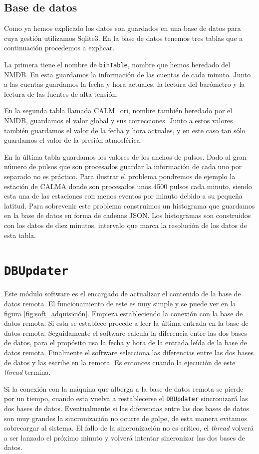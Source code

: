 	\subsection{Base de datos}
		Como ya hemos explicado los datos son guardados en una base de datos para cuya gestión utilizamos Sqlite3. En la base de datos tenemos
		tres tablas que a continuación procedemos a explicar.
	    	\par
		La primera tiene el nombre de \texttt{binTable}, nombre que hemos heredado del NMDB. En esta guardamos la información de las cuentas
		de cada minuto. Junto a las cuentas guardamos la fecha y hora actuales, la lectura del barómetro y la lectura de las fuentes de alta
		tensión.
	    	\par 
		En la segunda tabla llamada CALM\_ori, nombre también heredado por el NMDB, guardamos el valor global y sus correcciones. Junto a
		estos valores también guardamos el valor de la fecha y hora actuales, y en este caso tan sólo guardamos el valor de la presión
		atmosférica.
	    	\par
		En la última tabla guardamos los valores de los anchos de pulsos. Dado al gran número de pulsos que son procesados guardar la
		información de cada uno por separado no es práctico. Para ilustrar el problema pondremos de ejemplo la estación de CALMA donde son
		procesados unos 4500 pulsos cada minuto, siendo esta una de las estaciones con menos eventos por minuto debido a su pequeña latitud.
		Para sobrevenir este problema construimos un histograma que guardamos en la base de datos en forma de cadenas JSON\cite{JSON}. Los
		histogramas son construidos con los datos de diez minutos, intervalo que marca la resolución de los datos de esta tabla.

\section{\texttt{DBUpdater}}
	Este módulo software es el encargado de actualizar el contenido de la base de datos remota. El funcionamiento de este es muy simple y se puede
	ver en la figura \ref{fig:soft_adquisición}. Empieza estableciendo la conexión con la base de datos remota. Si esta se establece procede a
	leer la última entrada en la base de datos remota. Seguidamente el software calcula la diferencia entre las dos bases de datos, para el
	propósito usa la fecha y hora de la entrada leída de la base de datos remota. Finalmente el software selecciona las diferencias entre las dos
	bases de datos y las escribe en la remota. Es entonces cuando la ejecución de este \emph{thread} termina. 
	\par
	Si la conexión con la máquina que alberga a la base de datos remota se pierde por un tiempo, cuando esta vuelva a restablecerse el
	\texttt{DBUpdater} sincronizará las dos bases de datos. Eventualmente si las diferencias entre las dos bases de datos son muy grandes la
	sincronización no ocurre de golpe, de esta manera evitamos sobrecargar al sistema. El fallo de la sincronización no es crítico, el
	\emph{thread} volverá a ser lanzado el próximo minuto y volverá intentar sincronizar las dos bases de datos.

